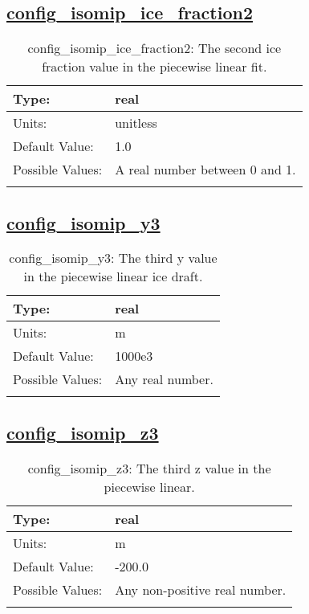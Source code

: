 \subsection[config\_isomip\_ice\_fraction2]{\hyperref[sec:nm_tab_isomip]{config\_isomip\_ice\_fraction2}}
\label{subsec:nm_sec_config_isomip_ice_fraction2}
\begin{center}
\begin{longtable}{| p{2.0in} || p{4.0in} |}
    \hline
    Type: & real \\
    \hline
    Units: & \si{unitless} \\
    \hline
    Default Value: & 1.0 \\
    \hline
    Possible Values: & A real number between 0 and 1. \\
    \hline
    \caption{config\_isomip\_ice\_fraction2: The second ice fraction value in the piecewise linear fit.}
\end{longtable}
\end{center}
\subsection[config\_isomip\_y3]{\hyperref[sec:nm_tab_isomip]{config\_isomip\_y3}}
\label{subsec:nm_sec_config_isomip_y3}
\begin{center}
\begin{longtable}{| p{2.0in} || p{4.0in} |}
    \hline
    Type: & real \\
    \hline
    Units: & \si{m} \\
    \hline
    Default Value: & 1000e3 \\
    \hline
    Possible Values: & Any real number. \\
    \hline
    \caption{config\_isomip\_y3: The third y value in the piecewise linear ice draft.}
\end{longtable}
\end{center}
\subsection[config\_isomip\_z3]{\hyperref[sec:nm_tab_isomip]{config\_isomip\_z3}}
\label{subsec:nm_sec_config_isomip_z3}
\begin{center}
\begin{longtable}{| p{2.0in} || p{4.0in} |}
    \hline
    Type: & real \\
    \hline
    Units: & \si{m} \\
    \hline
    Default Value: & -200.0 \\
    \hline
    Possible Values: & Any non-positive real number. \\
    \hline
    \caption{config\_isomip\_z3: The third z value in the piecewise linear.}
\end{longtable}
\end{center}
